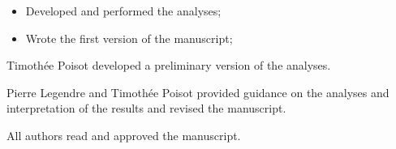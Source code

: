 \setcounter{corA}{0} %
\setcounter{secnumdepth}{1}
\renewcommand{\thefigure}{\arabic{figure}}
\setcounter{figure}{0}
\anglais


\contributions%
{
    \begin{itemize}
        \item Developed and performed the analyses;
        \item Wrote the first version of the manuscript;
    \end{itemize}

    Timothée Poisot developed a preliminary version of the analyses. 
    
    Pierre Legendre and Timothée Poisot provided guidance on the analyses and 
    interpretation of the results and revised the manuscript.
    
    All authors read and approved the manuscript.\\[1cm]
}

